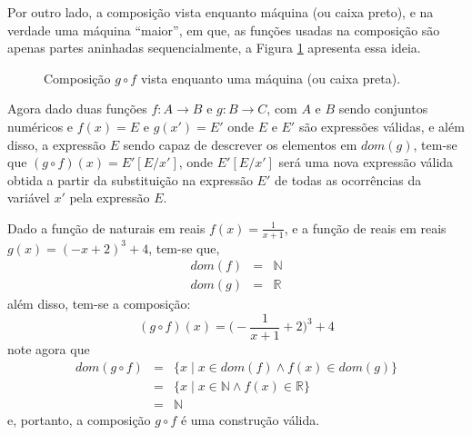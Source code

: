 Por outro lado, a composição vista enquanto máquina (ou caixa preto), e na verdade uma máquina ``maior'', em que, as funções usadas na composição são apenas partes aninhadas sequencialmente, a Figura \ref{fig:FuncaoCompostaBlackBox} apresenta essa ideia.

\begin{figure}[h]
	\centering
	\caption{Composição $g \circ f$ vista enquanto uma máquina (ou caixa preta).}
	\label{fig:FuncaoCompostaBlackBox}
\end{figure}


Agora dado duas funções $f: A \rightarrow B$ e $g: B \rightarrow C$, com $A$ e $B$ sendo conjuntos numéricos e $f(x) = E$ e $g(x') = E'$ onde $E$ e $E'$ são expressões válidas, e além disso, a expressão $E$ sendo capaz de descrever os elementos em $dom(g)$, tem-se que $(g \circ f)(x) = E'[E/x']$, onde $E'[E/x']$ será uma nova expressão válida obtida a partir da substituição na expressão $E'$ de todas as ocorrências da variável $x'$ pela expressão $E$.

\begin{exemplo}\label{exe:ComposicaoFuncao1}
	Dado a função de naturais em reais $f(x) = \frac{1}{x+1}$, e a função de reais em reais $g(x) = (-x + 2)^3 + 4$, tem-se que,
	\begin{eqnarray*}
		dom(f) & = & \mathbb{N}\\
		dom(g) & = & \mathbb{R}
	\end{eqnarray*}
	além disso, tem-se a composição: 
	$$(g \circ f)(x) = \Big(- \frac{1}{x+1} + 2\Big)^3 + 4$$
	note agora que
	\begin{eqnarray*}
		dom(g \circ f) & = & \{x \mid x \in dom(f) \land f(x) \in dom(g)\}\\ 
		& = & \{x \mid x \in \mathbb{N} \land f(x) \in \mathbb{R}\}\\
		& = & \mathbb{N}
	\end{eqnarray*}
	e, portanto, a composição $g \circ f$ é uma construção válida.
\end{exemplo}

